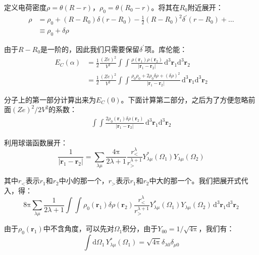 \begin{booknote*}
定义电荷密度$\rho=\theta(R-r)$，$\rho_{0}=\theta(R_{0}-r)$。将其在$R_{0}$附近展开：
\begin{align*}
\rho & =\rho_{0}+(R-R_{0})\delta(r-R_{0})-\frac{1}{2}(R-R_{0})^{2}\delta^{\prime}(r-R_{0})+\dots\\
 & \equiv\rho_{0}+\delta\rho
\end{align*}

由于$R-R_{0}$是一阶的，因此我们只需要保留$\delta^{\prime}$项。库伦能：
\begin{align*}
E_{C}(\alpha) & =\frac{1}{2}\frac{(Ze)^{2}}{V^{2}}\int\int\frac{\rho(\boldsymbol{r}_{1})\rho(\boldsymbol{r}_{2})}{\left|\boldsymbol{r}_{1}-\boldsymbol{r}_{2}\right|}\,\mathrm{d}^{3}\boldsymbol{r}_{1}\mathrm{d}^{3}\boldsymbol{r}_{2}\\
 & =\frac{1}{2}\frac{(Ze)^{2}}{V^{2}}\int\int\frac{\rho_{0}\rho_{0}+2\rho_{0}\delta\rho+(\delta\rho)^{2}}{\left|\boldsymbol{r}_{1}-\boldsymbol{r}_{2}\right|}\,\mathrm{d}^{3}\boldsymbol{r}_{1}\mathrm{d}^{3}\boldsymbol{r}_{2}
\end{align*}

分子上的第一部分计算出来为$E_{C}(0)$。下面计算第二部分，之后为了方便忽略前面$(Ze)^{2}/2V^{2}$的系数：
\begin{align*}
\int\int\frac{2\rho_{0}(\boldsymbol{r}_{1})\delta\rho(\boldsymbol{r}_{2})}{\left|\boldsymbol{r}_{1}-\boldsymbol{r}_{2}\right|}\,\mathrm{d}^{3}\boldsymbol{r}_{1}\mathrm{d}^{3}\boldsymbol{r}_{2}
\end{align*}

利用球谐函数展开：
\[
\frac{1}{\left|\boldsymbol{r}_{1}-\boldsymbol{r}_{2}\right|}=\sum_{\lambda\mu}\frac{4\mathrm{\pi}}{2\lambda+1}\frac{r^{\lambda}_{<}}{r^{\lambda+1}_{>}}Y^{*}_{\lambda\mu}(\Omega_{1})Y_{\lambda\mu}(\Omega_{2})
\]

其中$r_{<}$表示$r_{1}$和$r_{2}$中小的那一个，$r_{>}$表示$r_{1}$和$r_{2}$中大的那一个。我们把展开式代入，得：
\[
8\mathrm{\pi}\sum_{\lambda\mu}\frac{1}{2\lambda+1}\int\int\rho_{0}(\boldsymbol{r}_{1})\delta\rho(\boldsymbol{r}_{2})\frac{r^{\lambda}_{<}}{r^{\lambda+1}_{>}}Y^{*}_{\lambda\mu}(\Omega_{1})Y_{\lambda\mu}(\Omega_{2})\,\mathrm{d}^{3}\boldsymbol{r}_{1}\mathrm{d}^{3}\boldsymbol{r}_{2}
\]

由于$\rho_{0}(\boldsymbol{r}_{1})$中不含角度，可以先对$\Omega_{1}$积分，由于$Y_{00}=1/\sqrt{4\mathrm{\pi}}$，我们有：
\[
\int\mathrm{d}\Omega_{1}\,Y^{*}_{\lambda\mu}(\Omega_{1})=\sqrt{4\mathrm{\pi}}\delta_{\lambda0}\delta_{\mu0}
\]


\end{booknote*}
